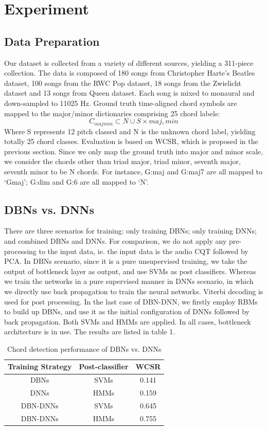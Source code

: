 \documentclass{article}
\begin{document}
\section{Experiment}
\subsection{Data Preparation}
Our dataset is collected from a variety of different sources, yielding a 311-piece collection. The data is composed of 180 songs from Christopher Harte's Beatles dataset, 100 songs from the RWC Pop dataset, 18 songs from the Zwielicht dataset and 13 songs from Queen dataset. Each song is mixed to monaural and down-sampled to 11025 Hz. Ground truth time-aligned chord symbols are mapped to the major/minor dictionaries comprising 25 chord labels:
\begin{equation}
C_{majmin} \subset {N} \cup S \times {maj,min}
\end{equation}
Where S represents 12 pitch classed and N is the unknown chord label, yielding totally 25 chord classes. Evaluation is based on WCSR, which is proposed in the previous section. Since we only map the ground truth into major and minor scale, we consider the chords other than triad major, triad minor, seventh major, seventh minor to be N chords. For instance, G:maj and G:maj7 are all mapped to `Gmaj'; G:dim and G:6 are all mapped to `N'. 
\subsection{DBNs vs. DNNs}
There are three scenarios for training: only training DBNs; only training DNNs; and combined DBNs and DNNs. For comparison, we do not apply any pre-processing to the input data, ie. the input data is the audio CQT followed by PCA. In DBNs scenario, since it is a pure unsupervised training, we take the output of bottleneck layer as output, and use SVMs as post classifiers. Whereas we train the networks in a pure supervised manner in DNNs scenario, in which we directly use back propagation to train the neural networks. Viterbi decoding is used for post processing. In the last case of DBN-DNN, we firstly employ RBMs to build up DBNs, and use it as the initial configuration of DNNs followed by back propagation. Both SVMs and HMMs are applied. In all cases, bottleneck architecture is in use. The results are listed in table 1. 

\begin{table}[h]
\begin{tabular}{|c|c|c|}
\hline
Training Strategy & Post-classifier & WCSR  \\ \hline
DBNs              & SVMs            & 0.141 \\ \hline
DNNs              & HMMs            & 0.159      \\ \hline
DBN-DNNs          & SVMs            & 0.645 \\ \hline
DBN-DNNs          & HMMs            & 0.755 \\ \hline
\end{tabular}
\caption{Chord detection performance of DBNs vs. DNNs}
\end{table}
\end{document}
